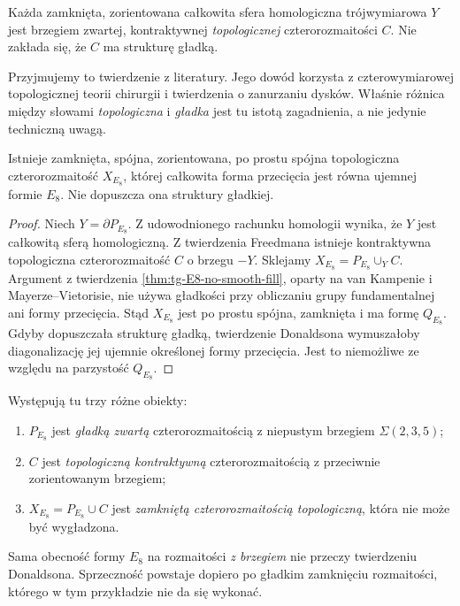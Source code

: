 \begin{twierdzenie}
Każda zamknięta, zorientowana całkowita sfera homologiczna
trójwymiarowa $Y$ jest brzegiem zwartej,
kontraktywnej \emph{topologicznej} czterorozmaitości $C$.
Nie zakłada się, że $C$ ma strukturę gładką.
\end{twierdzenie}

Przyjmujemy to twierdzenie z literatury. Jego dowód
korzysta z czterowymiarowej topologicznej teorii chirurgii
i twierdzenia o zanurzaniu dysków. Właśnie różnica między
słowami \emph{topologiczna} i \emph{gładka} jest tu istotą
zagadnienia, a nie jedynie techniczną uwagą.

\begin{wniosek}
Istnieje zamknięta, spójna, zorientowana, po prostu
spójna topologiczna czterorozmaitość $X_{E_8}$,
której całkowita forma przecięcia jest równa
ujemnej formie $E_8$. Nie dopuszcza ona struktury gładkiej.
\end{wniosek}
\begin{proof}
Niech $Y=\partial P_{E_8}$. Z udowodnionego rachunku
homologii wynika, że $Y$ jest całkowitą sferą homologiczną.
Z twierdzenia Freedmana istnieje kontraktywna topologiczna
czterorozmaitość $C$ o brzegu $-Y$. Sklejamy
$X_{E_8}=P_{E_8}\cup_Y C$. Argument z twierdzenia
\ref{thm:tg-E8-no-smooth-fill}, oparty na van Kampenie
i Mayerze--Vietorisie, nie używa gładkości przy
obliczaniu grupy fundamentalnej ani formy przecięcia.
Stąd $X_{E_8}$ jest po prostu spójna, zamknięta
i ma formę $Q_{E_8}$. Gdyby dopuszczała strukturę gładką,
twierdzenie Donaldsona wymuszałoby diagonalizację
jej ujemnie określonej formy przecięcia. Jest to
niemożliwe ze względu na parzystość $Q_{E_8}$.
\end{proof}

\begin{uwaga}
Występują tu trzy różne obiekty:
\begin{enumerate}[label=(\roman*)]
\item $P_{E_8}$ jest \emph{gładką zwartą} czterorozmaitością
z niepustym brzegiem $\Sigma(2,3,5)$;
\item $C$ jest \emph{topologiczną kontraktywną}
czterorozmaitością z przeciwnie zorientowanym brzegiem;
\item $X_{E_8}=P_{E_8}\cup C$ jest \emph{zamkniętą
czterorozmaitością topologiczną}, która nie może być wygładzona.
\end{enumerate}
Sama obecność formy $E_8$ na rozmaitości \emph{z brzegiem}
nie przeczy twierdzeniu Donaldsona. Sprzeczność powstaje
dopiero po gładkim zamknięciu rozmaitości, którego
w tym przykładzie nie da się wykonać.
\end{uwaga}

